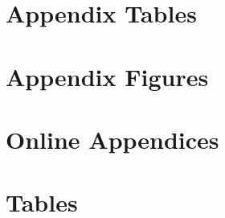 \documentclass[subeqn]{article}
\begin{document}
\section{Appendix Tables}

\clearpage
\newpage

\section{Appendix Figures}


\newpage
\appendix
\section*{Online Appendices}
\section{Tables}

\end{document}

